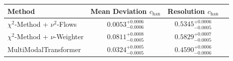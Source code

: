     \begin{tabular}{lccc}
        \toprule
        Method & Mean Deviation $c_{\text{han}}$ & Resolution $c_{\text{han}}$ \\
        \midrule
        $\chi^2$-Method + $\nu^2$-Flows & $0.0053^{+0.0006}_{-0.0006}$ & $0.5345^{+0.0006}_{-0.0005}$ \\
        $\chi^2$-Method + $\nu$-Weighter & $0.0811^{+0.0008}_{-0.0005}$ & $0.5829^{+0.0007}_{-0.0005}$ \\
        MultiModalTransformer & $0.0324^{+0.0005}_{-0.0005}$ & $0.4590^{+0.0006}_{-0.0006}$ \\
        \bottomrule
    \end{tabular}